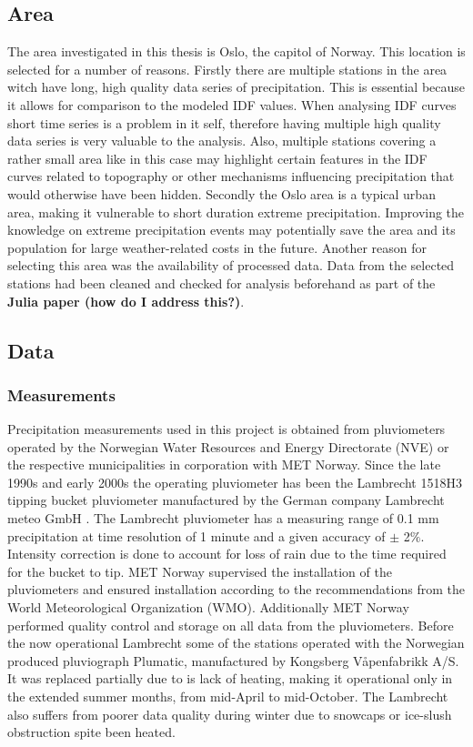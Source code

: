 \subsection{Area}

The area investigated in this thesis is Oslo, the capitol of Norway. This location is selected for a number of reasons. Firstly there are multiple stations in the area witch have long, high quality data series of precipitation. This is essential because it allows for comparison to the modeled IDF values. When analysing IDF curves short time series is a problem in it self, therefore having multiple high quality data series is very valuable to the analysis. Also, multiple stations covering a rather small area like in this case may highlight certain features in the IDF curves related to topography or other mechanisms influencing precipitation that would otherwise have been hidden. Secondly the Oslo area is a typical urban area, making it vulnerable to short duration extreme precipitation. Improving the knowledge on extreme precipitation events may potentially save the area and its population for large weather-related costs in the future. Another reason for selecting this area was the availability of processed data. Data from the selected stations had been cleaned and checked for analysis beforehand as part of the \textbf{Julia paper (how do I address this?)}. 

\subsection{Data}
\subsubsection{Measurements}
Precipitation measurements used in this project is obtained from pluviometers operated by the Norwegian Water Resources and Energy Directorate (NVE) or the respective municipalities in corporation with  MET Norway. Since the late 1990s and early 2000s the operating pluviometer has been the Lambrecht 1518H3 tipping bucket pluviometer manufactured by the German company Lambrecht meteo GmbH \cite{lutz_idf}. The Lambrecht pluviometer has a measuring range of 0.1 mm precipitation at time resolution of 1 minute and a given accuracy of $\pm$ 2$\%$. Intensity correction is done to account for loss of rain due to the time required for the bucket to tip. MET Norway supervised the installation of the pluviometers and ensured installation according to the recommendations from the World Meteorological Organization (WMO). Additionally MET Norway performed quality control and storage on all data from the pluviometers. Before the now operational Lambrecht some of the stations operated with the Norwegian produced pluviograph Plumatic, manufactured by Kongsberg Våpenfabrikk A/S. It was replaced partially due to is lack of heating, making it operational only in the extended summer months, from mid-April to mid-October. The Lambrecht also suffers from poorer data quality during winter due to snowcaps or ice-slush obstruction spite been heated.  

